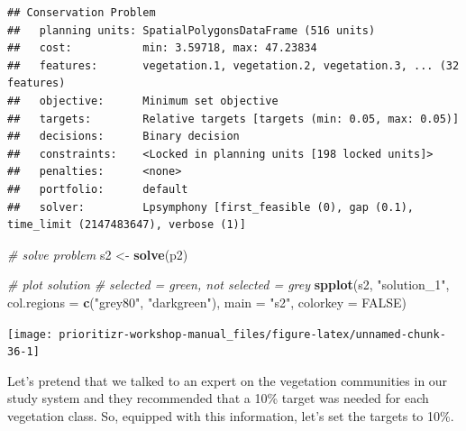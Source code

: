 \documentclass[
  12pt,
]{book}
\newenvironment{Shaded}{\begin{snugshade}}{\end{snugshade}}
\newcommand{\CommentTok}[1]{\textcolor[rgb]{0.56,0.35,0.01}{\textit{#1}}}
\newcommand{\DataTypeTok}[1]{\textcolor[rgb]{0.13,0.29,0.53}{#1}}
\newcommand{\FloatTok}[1]{\textcolor[rgb]{0.00,0.00,0.81}{#1}}
\newcommand{\KeywordTok}[1]{\textcolor[rgb]{0.13,0.29,0.53}{\textbf{#1}}}
\newcommand{\NormalTok}[1]{#1}
\newcommand{\OperatorTok}[1]{\textcolor[rgb]{0.81,0.36,0.00}{\textbf{#1}}}
\newcommand{\OtherTok}[1]{\textcolor[rgb]{0.56,0.35,0.01}{#1}}
\newcommand{\StringTok}[1]{\textcolor[rgb]{0.31,0.60,0.02}{#1}}
\begin{document}
\begin{verbatim}
## Conservation Problem
##   planning units: SpatialPolygonsDataFrame (516 units)
##   cost:           min: 3.59718, max: 47.23834
##   features:       vegetation.1, vegetation.2, vegetation.3, ... (32 features)
##   objective:      Minimum set objective 
##   targets:        Relative targets [targets (min: 0.05, max: 0.05)]
##   decisions:      Binary decision 
##   constraints:    <Locked in planning units [198 locked units]>
##   penalties:      <none>
##   portfolio:      default
##   solver:         Lpsymphony [first_feasible (0), gap (0.1), time_limit (2147483647), verbose (1)]
\end{verbatim}

\begin{Shaded}
\begin{Highlighting}[]
\CommentTok{# solve problem}
\NormalTok{s2 <-}\StringTok{ }\KeywordTok{solve}\NormalTok{(p2)}

\CommentTok{# plot solution}
\CommentTok{# selected = green, not selected = grey}
\KeywordTok{spplot}\NormalTok{(s2, }\StringTok{"solution_1"}\NormalTok{, }\DataTypeTok{col.regions =} \KeywordTok{c}\NormalTok{(}\StringTok{"grey80"}\NormalTok{, }\StringTok{"darkgreen"}\NormalTok{), }\DataTypeTok{main =} \StringTok{"s2"}\NormalTok{,}
       \DataTypeTok{colorkey =} \OtherTok{FALSE}\NormalTok{)}
\end{Highlighting}
\end{Shaded}

\begin{center}\texttt{[image: prioritizr-workshop-manual\_files/figure-latex/unnamed-chunk-36-1]} \end{center}

Let's pretend that we talked to an expert on the vegetation communities in our study system and they recommended that a 10\% target was needed for each vegetation class. So, equipped with this information, let's set the targets to 10\%.

\begin{Shaded}
\end{Shaded}
\end{document}
